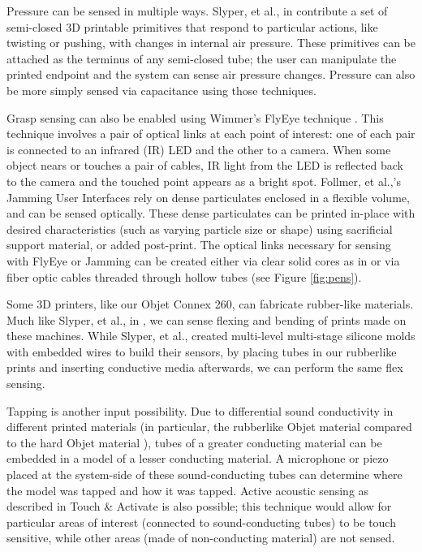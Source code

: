 Pressure can be sensed in multiple ways.  Slyper, et al., in \cite{Slyper-pressure} contribute a set of semi-closed 3D printable primitives that respond to particular actions, like twisting or pushing, with changes in internal air pressure.  These primitives can be attached as the terminus of any semi-closed tube; the user can manipulate the printed endpoint and the system can sense air pressure changes.  Pressure can also be more simply sensed via capacitance using those techniques.

Grasp sensing can also be enabled using Wimmer's FlyEye technique \cite{Wimmer-flyeye}.  This technique involves a pair of optical links at each point of interest: one of each pair is connected to an infrared (IR) LED and the other to a camera.  When some object nears or touches a pair of cables, IR light from the LED is reflected back to the camera and the touched point appears as a bright spot.  Follmer, et al.,'s Jamming User Interfaces \cite{Follmer-jamming} rely on dense particulates enclosed in a flexible volume, and can be sensed optically.  These dense particulates can be printed in-place with desired characteristics (such as varying particle size or shape) using sacrificial support material, or added post-print.  The optical links necessary for sensing with FlyEye or Jamming can be created either via clear solid cores as in \cite{Willis-printedoptics} or via fiber optic cables threaded through hollow tubes (see Figure \ref{fig:pens}).

Some 3D printers, like our Objet Connex 260, can fabricate rubber-like materials.  Much like Slyper, et al., in \cite{Slyper-shape}, we can sense flexing and bending of prints made on these machines.  While Slyper, et al., created multi-level multi-stage silicone molds with embedded wires to build their sensors, by placing tubes in our rubberlike prints and inserting conductive media afterwards, we can perform the same flex sensing.

Tapping is another input possibility.  Due to differential sound conductivity in different printed materials (in particular, the rubberlike Objet material compared to the hard Objet material ), tubes of a greater conducting material can be embedded in a model of a lesser conducting material.  A microphone or piezo placed at the system-side of these sound-conducting tubes can determine where the model was tapped and how it was tapped.  Active acoustic sensing as described in Touch \& Activate \cite{Ono-touchandactivate} is also possible; this technique would allow for particular areas of interest (connected to sound-conducting tubes) to be touch sensitive, while other areas (made of non-conducting material) are not sensed.

